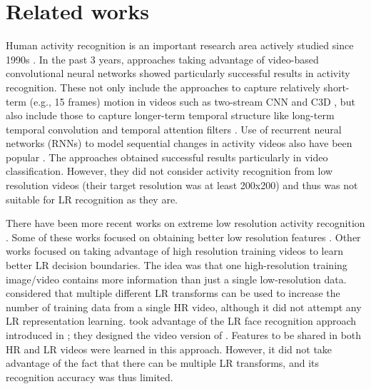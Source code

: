 \documentclass[letterpaper]{article} %
\begin{document}
\section{Related works}

Human activity recognition is an important research area actively studied since 1990s \cite{ryoo-review}. In the past 3 years, approaches taking advantage of video-based convolutional neural networks showed particularly successful results in activity recognition. These not only include the approaches to capture relatively short-term (e.g., 15 frames) motion in videos such as two-stream CNN \cite{simonyan14} and C3D \cite{c3d}, but also include those to capture longer-term temporal structure like long-term temporal convolution \cite{varol16} and temporal attention filters \cite{piergiovanni2016learning}. Use of recurrent neural networks (RNNs) to model sequential changes in activity videos also have been popular \cite{google15,yeong16}. The approaches obtained successful results particularly in video classification. However, they did not consider activity recognition from low resolution videos (their target resolution was at least 200x200) and thus was not suitable for LR recognition as they are.

There have been more recent works on extreme low resolution activity recognition \cite{dai15,ryoo17privacy,chen17,cheng17emotion}. Some of these works focused on obtaining better low resolution features \cite{dai15}. Other works focused on taking advantage of high resolution training videos to learn better LR decision boundaries. The idea was that one high-resolution training image/video contains more information than just a single low-resolution data.
\cite{ryoo17privacy} considered that multiple different LR transforms can be used to increase the number of training data from a single HR video, although it did not attempt any LR representation learning. \cite{chen17} took advantage of the LR face recognition approach introduced in \cite{lrface16}; they designed the video version of \cite{lrface16}. Features to be shared in both HR and LR videos were learned in this approach. However, it did not take advantage of the fact that there can be multiple LR transforms, and its recognition accuracy was thus limited.

\end{document}
